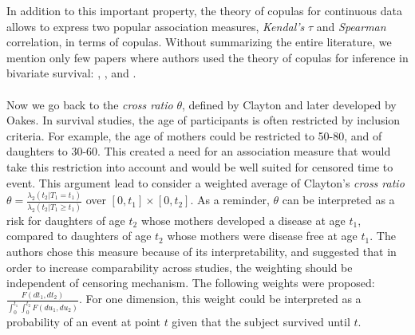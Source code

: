 \documentclass[]{article}
\begin{document}
In addition to this important property, the theory of copulas for continuous data allows to express two popular association measures, \emph{Kendal's} $\tau$ and \emph{Spearman} correlation, in terms of copulas. Without summarizing the entire literature, we mention only few papers where authors used the theory of copulas for inference in bivariate survival: \cite{shih1996tests}, \cite{shih1995inferences}, and \cite{zhang2008inference}.\\
~\\
Now we go back to the \emph{cross ratio} $\theta$, defined by Clayton and later developed by Oakes. In survival studies, the age of participants is often restricted by inclusion criteria. For example, the age of mothers could be restricted to 50-80, and of daughters to 30-60. This created a need for an association measure that would take this restriction into account and would be well suited for censored time to event. This argument lead \cite{fan2000dependence} to consider a weighted average of Clayton's \textit{cross ratio} $\theta = \frac{ \lambda_2(t_2|T_1=t_1)}{\lambda_2(t_2|T_1 \geq t_1)}$ over $[0,t_1] \times [0, t_2]$. As a reminder, $\theta$ can be interpreted as a risk for daughters of age $t_2$ whose mothers developed a disease at age $t_1$, compared to daughters of age $t_2$ whose mothers were disease free at age $t_1$. The authors chose this measure because of its interpretability, and suggested that in order to increase comparability across studies, the weighting should be independent of censoring mechanism. The following weights were proposed: $\frac{F(dt_1,dt_2)}{\int_0^{t_1}\int_0^{t_2} F(du_1, du_2)}$. For one dimension, this weight could be interpreted as a probability of an event at point $t$ given that the subject survived until $t$.\\
\end{document}
